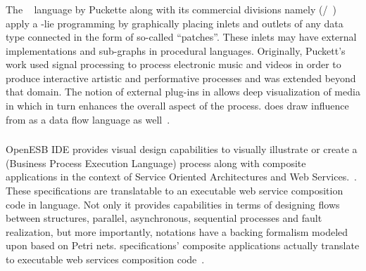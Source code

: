 \subsubsection{{\puredata}}

The {\puredata}~\cite{puredata} language by Puckette along with its 
commercial divisions namely ({\jitter}/{\maxmsp}~\cite{jitter}) apply a
{\dfg}-lie programming by graphically placing inlets and outlets of any data 
type connected in the form of so-called ``patches''. These inlets may have 
external implementations and sub-graphs in procedural languages. Originally, 
Puckett's work used signal processing to process electronic music and videos 
in order to produce interactive artistic and performative processes and was
extended beyond that domain. The notion of 
external plug-ins in {\puredata} allows deep visualization of media in {\opengl} which 
in turn enhances the overall aspect of the process. {\puredata} does draw 
influence from {\lucid} as a data flow language as well~\cite{flucid-dfg-viz-pst2011}.

\subsubsection{{\bpel}}

OpenESB IDE provides visual design capabilities to visually illustrate or 
create a {\bpel} (Business Process Execution Language) process along with 
composite applications in the context of Service Oriented Architectures and 
Web Services.~\cite{bpelse,koenig-ws-bpel-2007,ws-bpel-20}. These {\bpel} 
specifications are translatable to an executable web service composition code 
in {\java} language. Not only it provides capabilities in terms of designing 
flows between structures, parallel, asynchronous, sequential processes and 
fault realization, but more importantly, {\bpel} notations have a backing formalism 
modeled upon based on Petri nets.
%
{\bpel} specifications' composite applications actually translate to executable {\java}
web services composition code~\cite{flucid-dfg-viz-pst2011}.


